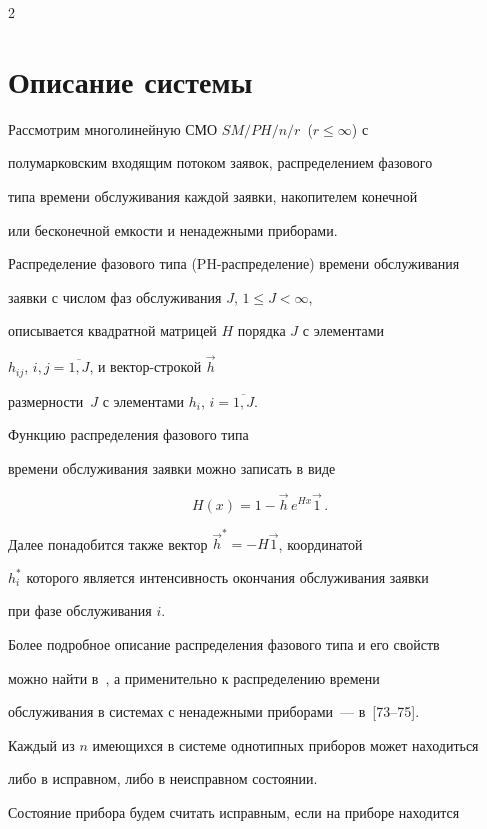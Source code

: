\begin{multicols}{2}
\section{Описание системы}





Рассмотрим многолинейную СМО $SM/PH/n/r$\  ($r\le \infty$) с


полумарковским входящим потоком заявок, распределением фазового


типа времени обслуживания каждой заявки, накопителем конечной


или бесконечной емкости и ненадежными приборами.





Распределение фазового типа (PH-рас\-пре\-де\-ле\-ние) времени обслуживания


заявки с числом фаз обслуживания $J$, $1\le J <\infty$,


описывается квад\-рат\-ной матрицей $H$ порядка $J$ с элементами


$h_{ij}$,  $i,j=\overline{1,J}$, и вектор-строкой $\vec h$


размерности~$J$ с элементами $h_i$, $i=\overline{1,J}$.


Функцию распределения фазового типа


времени обслуживания заявки можно записать в виде


$$


H(x) = 1-\vec h\, e^{Hx} \vec1\,.


$$


Далее понадобится также вектор $\vec h^*= -H\vec1$, координатой


$h^*_i$ которого является интенсивность окончания обслуживания заявки


при фазе обслуживания $i$.


Более подробное описание распределения фазового типа и его свойств


можно найти в~\cite{BP95}, а применительно к распределению времени


обслуживания в системах с ненадежными приборами~--- в~[73--75].





Каждый из $n$ имеющихся в системе однотипных приборов может находиться


либо в исправном, либо в неисправном состоянии.


Состояние прибора будем считать исправным, если на приборе находится



\end{multicols}
